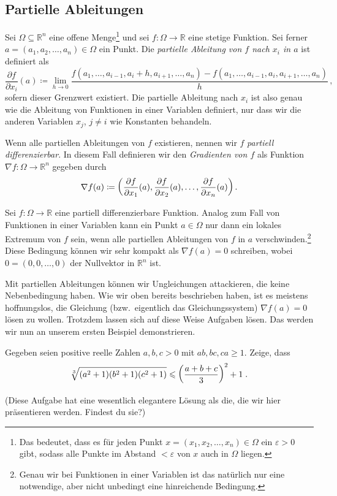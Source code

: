 \subsection*{Partielle Ableitungen}
\begin{definition}
	Sei $\Omega\subseteq \mathbb R^n$ eine offene Menge\footnote{Das bedeutet, dass es für jeden Punkt $x=(x_1,x_2,\dotsc,x_n)\in\Omega$ ein $\varepsilon >0$ gibt, sodass alle Punkte im Abstand $<\varepsilon$ von $x$ auch in $\Omega$ liegen.} und sei $f\colon \Omega\rightarrow \mathbb R$ eine stetige Funktion. Sei ferner $a=(a_1,a_2,\dotsc,a_n)\in\Omega$ ein Punkt. Die \emph{partielle Ableitung von $f$ nach $x_i$ in $a$} ist definiert als
	\begin{equation*}
		\frac{\partial f}{\partial x_i}(a)\coloneqq \lim_{h\rightarrow 0}\frac{f(a_1,\dotsc,a_{i-1},a_{i}+h,a_{i+1},\dotsc,a_n)-f(a_1,\dotsc,a_{i-1},a_{i},a_{i+1},\dotsc,a_n)}{h}\,,
	\end{equation*}
	sofern dieser Grenzwert existiert. Die partielle Ableitung nach $x_i$ ist also genau wie die Ableitung von Funktionen in einer Variablen definiert, nur dass wir die anderen Variablen $x_j$, $j\neq i$ wie Konstanten behandeln.
	
	Wenn alle partiellen Ableitungen von $f$ existieren, nennen wir $f$ \emph{partiell differenzierbar}. In diesem Fall definieren wir den \emph{Gradienten von $f$} als Funktion $\nabla f\colon \Omega\rightarrow \mathbb R^n$ gegeben durch
	\begin{equation*}
		\nabla f(a)\coloneqq \parens*{\frac{\partial f}{\partial x_1}(a),\frac{\partial f}{\partial x_2}(a),\dotsc,\frac{\partial f}{\partial x_n}(a)}\,.
	\end{equation*}
\end{definition}


Sei $f\colon \Omega\rightarrow \mathbb R$ eine partiell differenzierbare Funktion. Analog zum Fall von Funktionen in einer Variablen kann ein Punkt $a\in \Omega$ nur dann ein lokales Extremum von $f$ sein, wenn alle partiellen Ableitungen von $f$ in $a$ verschwinden.\footnote{Genau wir bei Funktionen in einer Variablen ist das natürlich nur eine notwendige, aber nicht unbedingt eine hinreichende Bedingung.} Diese Bedingung können wir sehr kompakt als $\nabla f(a)=0$ schreiben, wobei $0=(0,0,\dotsc,0)$ der Nullvektor in $\mathbb R^n$ ist.

Mit partiellen Ableitungen können wir Ungleichungen attackieren, die keine Nebenbedingung haben. Wie wir oben bereits beschrieben haben, ist es meistens hoffnungslos, die Gleichung (bzw.\ eigentlich das Gleichungssystem) $\nabla f(a)=0$ lösen zu wollen. Trotzdem lassen sich auf diese Weise Aufgaben lösen. Das werden wir nun an unserem ersten Beispiel demonstrieren.
\begin{aufgabe*}
	Gegeben seien positive reelle Zahlen $a,b,c>0$ mit $ab,bc,ca\geqslant 1$. Zeige, dass
	\begin{equation*}
		\sqrt[3]{\parens*{a^2+1}\parens*{b^2+1}\parens*{c^2+1}}\leqslant\parens*{\frac{a+b+c}{3}}^2+1\;.
	\end{equation*}
\end{aufgabe*}
(Diese Aufgabe hat eine wesentlich elegantere Lösung als die, die wir hier präsentieren werden. Findest du sie?)


